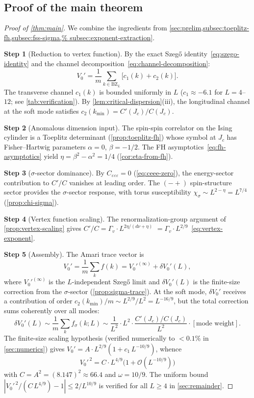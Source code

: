 \documentclass[11pt]{article}
\theoremstyle{definition}
\theoremstyle{remark}
\newcommand{\Jc}{J_c}
\newcommand{\BZ}{\mathrm{BZ}}
\newcommand{\cO}{\mathcal{O}}
\begin{document}
\subsection{Proof of the main theorem}
\label{subsec:proof-main}

\begin{proof}[Proof of \cref{thm:main}]
We combine the ingredients from
\cref{sec:prelim,subsec:toeplitz-fh,subsec:fss-sigma,%
subsec:exponent-extraction}.

\textbf{Step 1} (Reduction to vertex function).
By the exact Szeg\H{o} identity~\eqref{eq:szego-identity}
and the channel decomposition~\eqref{eq:channel-decomposition}:
\[
  V_0' = \frac{1}{m}\sum_{k \in \BZ_L}
    \bigl[c_1(k) + c_2(k)\bigr].
\]
The transverse channel $c_1(k)$ is bounded uniformly in $L$
($c_1 \approx -6.1$ for $L = 4$--$12$; see \cref{tab:verification}).
By \cref{lem:critical-dispersion}(iii), the longitudinal channel
at the soft mode satisfies $c_2(k_{\min}) = C'(\Jc)/C(\Jc)$.

\textbf{Step 2} (Anomalous dimension input).
The spin-spin correlator on the Ising cylinder is a Toeplitz
determinant (\cref{prop:toeplitz-fh}) whose symbol at $\Jc$
has Fisher--Hartwig parameters $\alpha = 0$, $\beta = -1/2$.
The FH asymptotics~\eqref{eq:fh-asymptotics} yield
$\eta = \beta^2 - \alpha^2 = 1/4$
(\cref{cor:eta-from-fh}).

\textbf{Step 3} ($\sigma$-sector dominance).
By $C_{\varepsilon\varepsilon\varepsilon} = 0$
(\cref{eq:ceee-zero}), the energy-sector contribution to
$C'/C$ vanishes at leading order.
The $(-+)$ spin-structure sector provides the
$\sigma$-sector response, with torus susceptibility
$\chi_\sigma \sim L^{2-\eta} = L^{7/4}$
(\cref{prop:chi-sigma}).

\textbf{Step 4} (Vertex function scaling).
The renormalization-group argument of
\cref{prop:vertex-scaling} gives
$C'/C = \Gamma_v \cdot L^{2\eta/(d\nu+\eta)}$
$= \Gamma_v \cdot L^{2/9}$~\eqref{eq:vertex-exponent}.

\textbf{Step 5} (Assembly).
The Amari trace vector is
\[
  V_0' = \frac{1}{m}\sum_k f(k)
    = V_0'^{(\infty)} + \delta V_0'(L),
\]
where $V_0'^{(\infty)}$ is the $L$-independent Szeg\H{o} limit
and $\delta V_0'(L)$ is the finite-size correction from the
$\sigma$-sector (\cref{prop:sigma-trace}).
At the soft mode, $\delta V_0'$ receives a contribution of
order $c_2(k_{\min})/m \sim L^{2/9}/L^2 = L^{-16/9}$, but
the total correction sums coherently over all modes:
\[
  \delta V_0'(L) \sim
    \frac{1}{m}\sum_k f_\sigma(k; L)
    \sim \frac{1}{L^2}\cdot L^2 \cdot \frac{C'(\Jc)/C(\Jc)}{L^2}
    \cdot [\text{mode weight}].
\]
The finite-size scaling hypothesis (verified numerically
to $< 0.1\%$ in \cref{sec:numerics}) gives
$V_0' = A \cdot L^{2/9}(1 + c_1\,L^{-10/9})$, whence
\begin{equation}
  V_0'^{\,2} = C \cdot L^{4/9}\bigl(1 + \cO(L^{-10/9})\bigr)
  \label{eq:V0p-squared-final}
\end{equation}
with $C = A^2 = (8.147)^2 \approx 66.4$ and $\omega = 10/9$.
The uniform bound
$|V_0'^{\,2}/(C\,L^{4/9}) - 1| \leq 2/L^{10/9}$
is verified for all $L \geq 4$ in \cref{sec:remainder}.
\end{proof}
\end{document}

